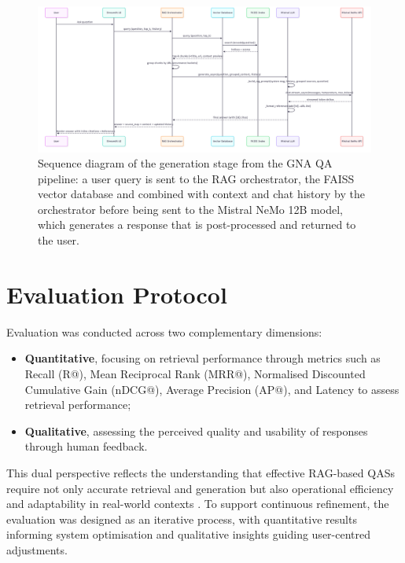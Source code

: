 \begin{spacing}{1.5}
\begin{figure}[H]
  \centering
  \includegraphics[width=\textwidth]{images/generation_workflow.png} 
  \caption{Sequence diagram of the generation stage from the GNA QA pipeline: a user query is sent to the RAG orchestrator, the FAISS vector database and combined with context and chat history by the orchestrator before being sent to the Mistral NeMo 12B model, which generates a response that is post-processed and returned to the user.}
  \label{fig:generation_workflow}
\end{figure}


\section{Evaluation Protocol}\label{sec:evaluation_protocol}
Evaluation was conducted across two complementary dimensions: 
\begin{itemize}
      \item \textbf{Quantitative}, focusing on retrieval performance through metrics such as Recall (R@), Mean Reciprocal Rank (MRR@), Normalised Discounted Cumulative Gain (nDCG@), Average Precision (AP@), and Latency to assess retrieval performance;
      \item \textbf{Qualitative}, assessing the perceived quality and usability of responses through human feedback.
\end{itemize}

This dual perspective reflects the understanding that effective RAG-based QASs require not only accurate retrieval and generation but also operational efficiency and adaptability in real-world contexts \citep{akkiraju_facts_2024}. To support continuous refinement, the evaluation was designed as an iterative process, with quantitative results informing system optimisation and qualitative insights guiding user-centred adjustments.


\end{spacing}
